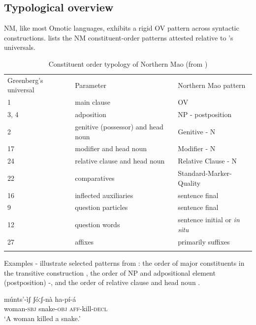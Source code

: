 \documentclass[output=paper]{langsci/langscibook}
\begin{document}
\subsection{Typological overview}\label{sec:mahland:1.1}

NM, like most Omotic languages, exhibits a rigid OV pattern across syntactic constructions.  lists the NM constituent-order patterns attested relative to \cite{Greenberg1993}'s universals. 

\begin{table}
\caption{Constituent order typology of Northern Mao (from \citealt[48]{Ahland2012})}
\label{tab:mahland:1}
  	\centering
\begin{tabularx}{\textwidth}{XXX}
\lsptoprule

Greenberg's universal & Parameter & Northern Mao pattern\\
1 & main clause & OV\\
3, 4 & adposition & NP - postposition \\
2 & genitive (possessor) and head noun & Genitive - N\\
17 & modifier and head noun & Modifier - N\\
24 & \mdseries relative clause\index{subordination!relative clauses} and head noun & Relative Clause - N\\
22 & comparatives & Standard-Marker-Quality\\
16 & inflected auxiliaries & sentence final\\
9 & question particles & sentence final\\
12 & question words & sentence initial or \textit{in situ}\\
27 & affixes & primarily suffixes\\
\lspbottomrule
\end{tabularx}
\end{table}

Examples - illustrate selected patterns from : the order of major constituents in the transitive construction , the order of NP and adpositional element (postposition) -, and the order of relative clause and head noun . 

\ea\label{ex:mahland:1}
\gll  múnts'-ìʃ       ʃóːʃ-nà          ha-pí-{\downstep}á \\
woman\textsc{{}-sbj}    snake\textsc{{}-obj}     \textsc{aff}-kill\textsc{{}-decl} \\
\glt `A woman killed a snake.'
\z        
\end{document}
